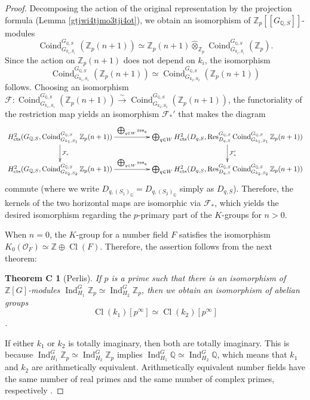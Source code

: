 \documentclass{article}
\numberwithin{equation}{section} %
\newtheorem*{themC}{Theorem C}
\begin{document}
\begin{proof}
  Decomposing the action of the original representation by the projection formula (Lemma \ref{gtjwi4tjmo3tji4ot}), we obtain an isomorphism of $\mathbb{Z}_p[[G_{\mathbb{Q},S}]]$-modules
  \[
    \operatorname{Coind}_{G_{k_i,S_i}}^{G_{\mathbb{Q},S}} (\mathbb{Z}_p(n+1)) \simeq \mathbb{Z}_p(n+1) \widehat{\otimes}_{\mathbb{Z}_p} \operatorname{Coind}_{G_{k_i,S_i}}^{G_{\mathbb{Q},S}} (\mathbb{Z}_p).
  \]
  Since the action on $\mathbb{Z}_p(n+1)$ does not depend on $k_i$, the isomorphism
  \[
    \operatorname{Coind}_{G_{k_1,S_1}}^{G_{\mathbb{Q},S}} (\mathbb{Z}_p(n+1)) \simeq \operatorname{Coind}_{G_{k_2,S_2}}^{G_{\mathbb{Q},S}} (\mathbb{Z}_p(n+1))
  \]
  follows. Choosing an isomorphism $\mathcal{F}: \operatorname{Coind}_{G_{k_1,S_1}}^{G_{\mathbb{Q},S}} (\mathbb{Z}_p(n+1)) \overset{\sim}{\to}\operatorname{Coind}_{G_{k_2,S_2}}^{G_{\mathbb{Q},S}} (\mathbb{Z}_p(n+1))$, the functoriality of the restriction map yields an isomorphism $\mathcal{F}_*'$ that makes the diagram
  \[
    \xymatrix@C=50pt{
      H^2_{\rm cts}(G_{\mathbb{Q},S},\operatorname{Coind}_{G_{k_1,S_1}}^{G_{\mathbb{Q},S}}\mathbb{Z}_p(n+1)) \ar[r]^-{\bigoplus_{q \in W} \mathrm{res}_q} \ar[d]^-{\mathcal{F}_*} & \bigoplus_{q \in W} H^2_{\rm cts}(D_{q,S},\operatorname{Res}_{D_{q,S}}^{G_{\mathbb{Q},S}}\operatorname{Coind}_{G_{k_1,S_1}}^{G_{\mathbb{Q},S}}\mathbb{Z}_p(n+1)) \ar[d]^-{\mathcal{F}_*'} \\
      H^2_{\rm cts}(G_{\mathbb{Q},S},\operatorname{Coind}_{G_{k_2,S_2}}^{G_{\mathbb{Q},S}}\mathbb{Z}_p(n+1)) \ar[r]^-{\bigoplus_{q \in W} \mathrm{res}_q} & \bigoplus_{q \in W} H^2_{\rm cts}(D_{q,S},\operatorname{Res}_{D_{q,S}}^{G_{\mathbb{Q},S}}\operatorname{Coind}_{G_{k_2,S_2}}^{G_{\mathbb{Q},S}}\mathbb{Z}_p(n+1))
    }
  \]
  commute (where we write $D_{q,(S_1)_{\mathbb{Q}}} = D_{q,(S_2)_{\mathbb{Q}}}$ simply as $D_{q,S}$). Therefore, the kernels of the two horizontal maps are isomorphic via $\mathcal{F}_*$, which yields the desired isomorphism regarding the $p$-primary part of the $K$-groups for $n > 0$.

        When $n=0$, the $K$-group for a number field $F$ satisfies the isomorphism $K_0(\mathcal{O}_F) \simeq \mathbb{Z} \oplus \operatorname{Cl}(F)$. Therefore, the assertion follows from the next theorem:
\begin{themC}[Perlis]
  If $p$ is a prime such that there is an isomorphism of $\mathbb{Z}[G]$-modules $\operatorname{Ind}_{H_1}^G \mathbb{Z}_p \simeq \operatorname{Ind}_{H_2}^G\mathbb{Z}_p$, then we obtain an isomorphism of abelian groups
  \[
    \operatorname{Cl}(k_1)[p^\infty] \simeq \operatorname{Cl}(k_2)[p^\infty]
  \]
  \cite[Theorem 3]{Perlis2}.
\end{themC}

If either $k_1$ or $k_2$ is totally imaginary, then both are totally imaginary. This is because $\operatorname{Ind}_{H_1}^G\mathbb{Z}_p \simeq \operatorname{Ind}_{H_2}^G\mathbb{Z}_p$ implies $\operatorname{Ind}_{H_1}^G\mathbb{Q} \simeq \operatorname{Ind}_{H_2}^G\mathbb{Q}$, which means that $k_1$ and $k_2$ are arithmetically equivalent. Arithmetically equivalent number fields have the same number of real primes and the same number of complex primes, respectively \cite[Theorem 1]{Perlis}.
    \end{proof}
\end{document}
